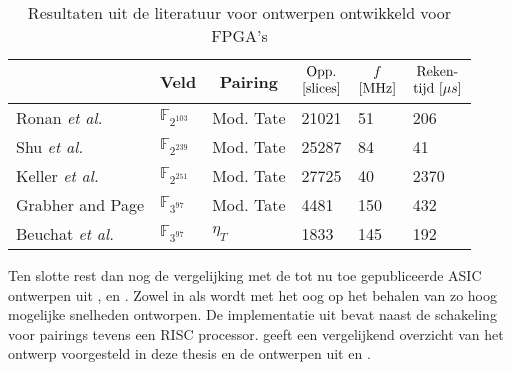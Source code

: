 \begin{table}[h]
	\caption{Resultaten uit de literatuur voor ontwerpen ontwikkeld voor FPGA's}
	\label{tabel-resultaten-fpga}

	\centering
	\begin{tabular}{llllll}
		\toprule
		&	\multicolumn{1}{c}{Veld}	& \multicolumn{1}{c}{Pairing}	& $\begin{array}{@{}c@{}}\text{Opp.}\\\text{[slices]}\end{array}$	& $\begin{array}{@{}c@{}}f\\\text{[MHz]}\end{array}$	& $\begin{array}{@{}c@{}}\text{Reken-}\\\text{tijd }[\mu s]\end{array}$\\
		\midrule
		Ronan \emph{et al.} \cite{ronan}				& $\mathbb{F}_{2^{103}}$	& Mod. Tate	& 21021	& 51	& 206\\
		Shu \emph{et al.} \cite{shu}					& $\mathbb{F}_{2^{239}}$	& Mod. Tate	& 25287	& 84	& 41\\
		Keller \emph{et al.} \cite{keller}			& $\mathbb{F}_{2^{251}}$	& Mod. Tate	& 27725	& 40	& 2370\\
		Grabher and Page \cite{grabher}				& $\mathbb{F}_{3^{97}}$		& Mod. Tate	& 4481	& 150	& 432\\
		Beuchat \emph{et al.} \cite{beuchat-eta}	& $\mathbb{F}_{3^{97}}$		& $\eta_T$	& 1833	& 145	& 192\\
		\bottomrule
	\end{tabular}
\end{table}

Ten slotte rest dan nog de vergelijking met de tot nu toe gepubliceerde ASIC ontwerpen uit \cite{beuchat-asic}, \cite{kammler} en \cite{savas}. Zowel in \cite{beuchat-asic} als \cite{savas} wordt met het oog op het behalen van zo hoog mogelijke snelheden ontworpen. De implementatie uit \cite{kammler} bevat naast de schakeling voor pairings tevens een RISC processor.  geeft een vergelijkend overzicht van het ontwerp voorgesteld in deze thesis en de ontwerpen uit \cite{beuchat-asic} en \cite{kammler}.

